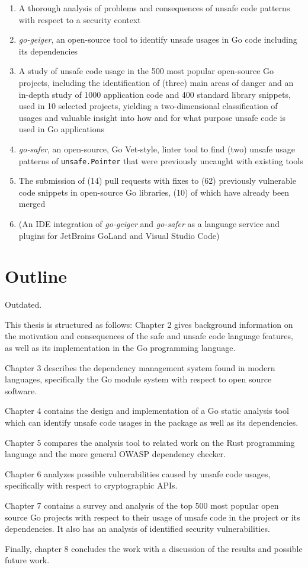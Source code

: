 \begin{enumerate}
    \item A thorough analysis of problems and consequences of unsafe code patterns with respect to a security context
    \item \textit{go-geiger}, an open-source tool to identify unsafe usages in Go code including its dependencies
    \item A study of unsafe code usage in the 500 most popular open-source Go projects, including the identification
    of (three) main areas of danger and an in-depth study of 1000 application code and 400 standard library snippets,
    used in 10 selected projects, yielding a two-dimensional classification of usages and valuable insight into how and
    for what purpose unsafe code is used in Go applications
    \item \textit{go-safer}, an open-source, Go Vet-style, linter tool to find (two) unsafe usage patterns of \texttt{unsafe.Pointer}
    that were previously uncaught with existing tools
    \item The submission of (14) pull requests with fixes to (62) previously vulnerable code snippets in open-source Go
    libraries, (10) of which have already been merged
    \item (An IDE integration of \textit{go-geiger} and \textit{go-safer} as a language service and plugins for
    JetBrains GoLand and Visual Studio Code)
\end{enumerate}



\section{Outline}\label{sec:outline}

Outdated.

This thesis is structured as follows: Chapter 2 gives background information on the motivation
and consequences of the safe and unsafe code language features, as well as its implementation
in the Go programming language.

Chapter 3 describes the dependency management system found in modern languages, specifically
the Go module system with respect to open source software.

Chapter 4 contains the design and implementation of a Go static analysis tool which can identify
unsafe code usages in the package as well as its dependencies.

Chapter 5 compares the analysis tool to related work on the Rust programming language and the
more general OWASP dependency checker.

Chapter 6 analyzes possible vulnerabilities caused by unsafe code usages, specifically with
respect to cryptographic APIs.

Chapter 7 contains a survey and analysis of the top 500 most popular open source Go projects
with respect to their usage of unsafe code in the project or its dependencies. It also has an
analysis of identified security vulnerabilities.

Finally, chapter 8 concludes the work with a discussion of the results and possible future work.